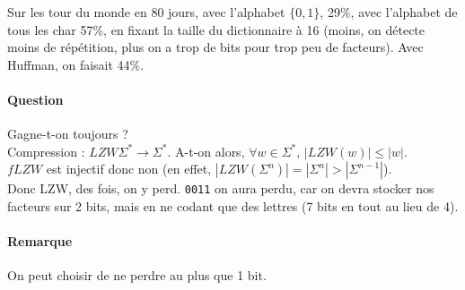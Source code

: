 \begin{com}
	Sur les tour du monde en 80 jours, avec l'alphabet $\{0, 1\}$, 29\%, avec l'alphabet de tous les char 57\%, en fixant la taille du dictionnaire à 16 (moins, on détecte moins de répétition, plus on a trop de bits pour trop peu de facteurs). Avec Huffman, on faisait 44\%.
\end{com}

\paragraph{Question} Gagne-t-on toujours ?\\
Compression : $LZW \Sigma^* \to \Sigma^*$. A-t-on alors, $\forall w \in \Sigma^*, \, |LZW(w)| \leq |w|$.\\
$fLZW$ est injectif donc non (en effet, $\left|LZW\left(\Sigma^n\right)\right| = \left|\Sigma^n\right|> \left| \Sigma^{n-1}\right| $).\\

Donc LZW, des fois, on y perd. \texttt{0011} on aura perdu, car on devra stocker nos facteurs sur 2 bits, mais en ne codant que des lettres (7 bits en tout au lieu de 4).

\paragraph{Remarque} On peut choisir de ne perdre au plus que 1 bit.